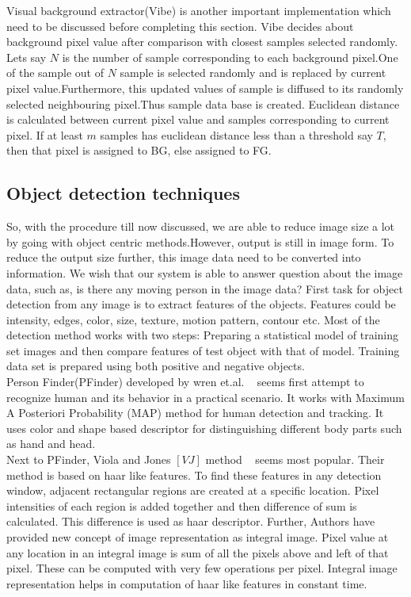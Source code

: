 Visual background extractor(Vibe) is another important implementation
which need to be discussed before completing this section. Vibe decides
about background pixel value after comparison with closest samples
selected randomly. Lets say $N$ is the number of sample corresponding to
each background pixel.One of the sample out of $N$ sample is selected
randomly and is replaced by current pixel value.Furthermore, this
updated values of sample is diffused to its randomly selected
neighbouring pixel.Thus sample data base is created. Euclidean distance
is calculated between current pixel value and samples corresponding to
current pixel. If at least $m$ samples has euclidean distance less than
a threshold say $T$, then that pixel is assigned to BG, else assigned to
FG.\\

\subsection{Object detection techniques}
So, with the procedure till now discussed, we are able to reduce image
size a lot by going with object centric methods.However, output is still
in image form. To reduce the output size further, this image data need
to be converted into information. We wish that our system is able to
answer question about the image data, such as, is there any moving
person in the image data? First task for object detection from any image
is to extract features of the objects. Features could be intensity,
edges, color, size, texture, motion pattern, contour etc. Most of the
detection method works with two steps: Preparing a statistical model of
training set images and then compare features of test object with that
of model.  Training data set is prepared using both positive and
negative objects.\\

Person Finder(PFinder) developed by wren et.al. ~\cite{12} seems first
attempt to recognize human and its behavior in a practical scenario. It
works with Maximum A Posteriori Probability (MAP) method for human
detection and tracking. It uses color and shape based descriptor for
distinguishing different body parts such as hand and head.\\

Next to PFinder, Viola and Jones $[VJ]$ method ~\cite{16, 17} seems most
popular. Their method is based on haar like features. To find these
features in any detection window, adjacent rectangular regions are
created at a specific location. Pixel intensities of each region is
added together and then difference of sum is calculated. This difference
is used as haar descriptor. Further, Authors have provided new concept
of image representation as integral image.  Pixel value at any location
in an integral image is sum of all the pixels above and left of that
pixel.  These can be computed with very few operations per pixel.
Integral image representation helps in computation of haar like features
in constant time.\\

